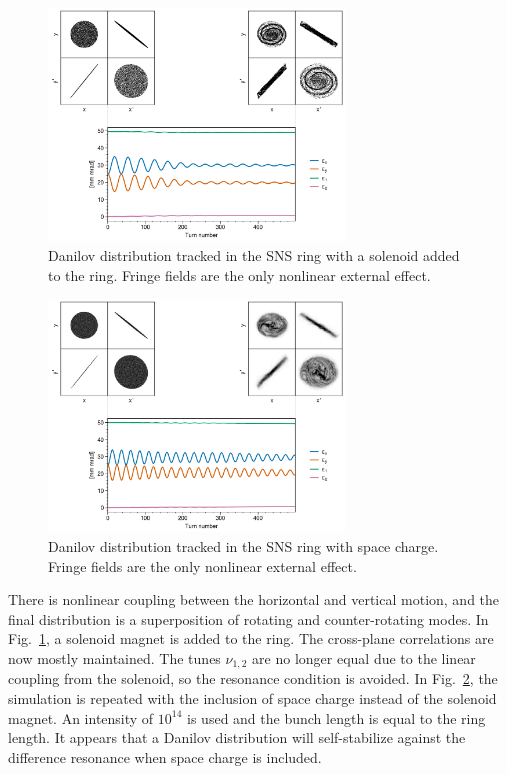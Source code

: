 \begin{figure}[!p]
    \centering
    \includegraphics[width=0.7\textwidth]{Images/chapter3/fringe_solenoid.png}
    \caption{Danilov distribution tracked in the SNS ring with a solenoid added to the ring. Fringe fields are the only nonlinear external effect.}
    \label{fig:fringe_b}
    \vspace*{3cm}
\end{figure}

\begin{figure}[!p]
    \centering
    \includegraphics[width=0.7\textwidth]{Images/chapter3/fringe_spacecharge.png}
    \caption{Danilov distribution tracked in the SNS ring with space charge. Fringe fields are the only nonlinear external effect.}
    \label{fig:fringe_c}
    \vspace*{3cm}
\end{figure}


There is nonlinear coupling between the horizontal and vertical motion, and the final distribution is a superposition of rotating and counter-rotating modes. In Fig.~\ref{fig:fringe_b}, a solenoid magnet is added to the ring. The cross-plane correlations are now mostly maintained. The tunes $\nu_{1, 2}$ are no longer equal due to the linear coupling from the solenoid, so the resonance condition is avoided. In Fig.~\ref{fig:fringe_c}, the simulation is repeated with the inclusion of space charge instead of the solenoid magnet. An intensity of $10^{14}$ is used and the bunch length is equal to the ring length. It appears that a Danilov distribution will self-stabilize against the difference resonance when space charge is included.

